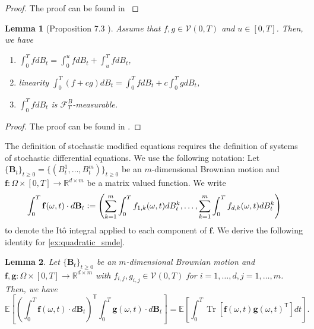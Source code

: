 \documentclass[12pt]{article}
\newtheorem{lemma}[lemma]{Lemma}
\theoremstyle{definition}
\numberwithin{equation}{section}
\newcommand{\R}{\mathbb{R}}
\newcommand{\CF}{\mathcal{F}}
\newcommand{\CV}{\mathcal{V}}
\newcommand{\T}{\mathsf{T}}
\newcommand{\ev}[1]{\mathbb{E}\left[{#1}\right]}
\newcommand{\defeq}{\vcentcolon=}
\DeclareMathOperator{\Tr}{Tr}
\begin{document}
\begin{proof}
  The proof can be found in \cite[pp.~208]{capassoIntroductionContinuousTimeStochastic2012}
\end{proof}
\begin{lemma}[Proposition 7.3 ]
  Assume that $f,g \in \CV(0,T)$ and $u \in [0,T]$. Then, we have
  \begin{enumerate}[label=(\roman*)]
    \item $\displaystyle\int_0^TfdB_t = \int_0^ufdB_t + \int_u^TfdB_t$,
    \item linearity $\displaystyle\int_0^T(f+cg)dB_t =  \int_0^TfdB_t + c \int_0^TgdB_t$,
    \item $\displaystyle\int_0^TfdB_t$ is $\CF_T^B$-measurable.
  \end{enumerate}
\end{lemma}
\begin{proof}
  The proof can be found in \cite{eAppliedStochasticAnalysis2021}.
\end{proof}
The definition of stochastic modified equations requires the definition of systems of stochastic differential equations. We use the following notation: Let $\{\mathbf{B}_t\}_{t\geq 0} = \{(B^1_t, \dots, B^m_t)\}_{t\geq 0}$ be an $m$-dimensional Brownian motion and $\mathbf{f}: \Omega \times [0,T] \rightarrow \R^{d \times m}$ be a matrix valued function. We write 
\begin{equation*}
  \int_0^T \mathbf{f}(\omega, t)\cdot d\mathbf{B}_t \defeq \left(\sum_{k=1}^m\int_0^T f_{1,k}(\omega, t)dB_t^k, \dots, \sum_{k=1}^m\int_0^T f_{d,k}(\omega, t)dB_t^k \right)
\end{equation*}
to denote the Itô integral applied to each component of $\mathbf{f}$.
We derive the following identity for \autoref{ex:quadratic_smde}.
\begin{lemma}
  \label{lem:ito}
  Let $\{\pmb{B}_t\}_{t\geq0}$ be an $m$-dimensional Brownian motion and $\mathbf{f}, \mathbf{g}: \Omega \times [0,T] \rightarrow \R^{d \times m}$ with $f_{i,j}, g_{i,j}  \in \CV(0,T)$ for $i=1,\dots,d, j=1,\dots,m$. Then, we have
  \begin{equation}
  \label{eq:multivariate_ito_isometry}
    \ev{\left(\int_0^T \pmb{f}(\omega, t)\cdot d\pmb{B}_t\right)^\mathsf{T}\int_0^T \pmb{g}(\omega, t)\cdot d\pmb{B}_t} = \ev{\int_0^T \Tr\left[\pmb{f}(\omega, t)\pmb{g}(\omega, t)^\T\right]dt}.
  \end{equation}

\end{lemma}
\end{document}
